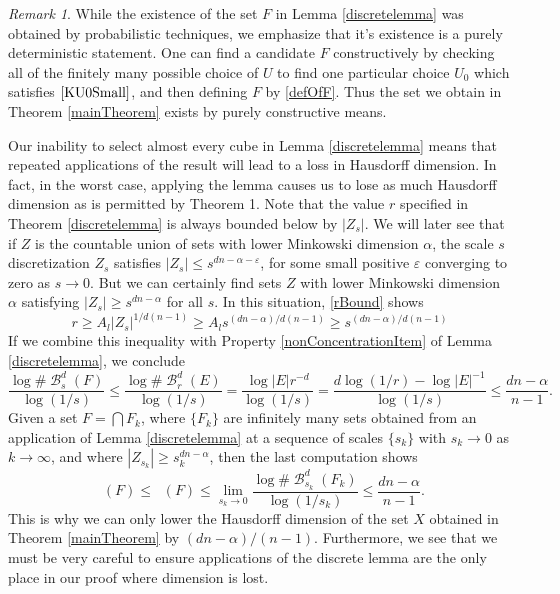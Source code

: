\documentclass[dvipsnames,letterpaper,12pt]{article}
\numberwithin{equation}{section}
\theoremstyle{plain}
\theoremstyle{remark}
\newtheorem*{remark}{Remark}
\DeclareMathOperator{\hausdim}{\dim_{\mathbf{H}}}
\DeclareMathOperator{\upminkdim}{\overline{\dim}_{\mathbf{M}}}
\DeclareMathOperator{\B}{\mathcal{B}}
\begin{document}
\begin{remark}
	While the existence of the set $F$ in Lemma \ref{discretelemma} was obtained by probabilistic techniques, we emphasize that it's existence is a purely deterministic statement. One can find a candidate $F$ constructively by checking all of the finitely many possible choice of $U$ to find one particular choice $U_0$ which satisfies $\eqref{KU0Small}$, and then defining $F$ by \eqref{defOfF}.
	Thus the set we obtain in Theorem \ref{mainTheorem} exists by purely constructive means.
\end{remark}

Our inability to select almost every cube in Lemma \ref{discretelemma} means that repeated applications of the result will lead to a loss in Hausdorff dimension. In fact, in the worst case, applying the lemma causes us to lose as much Hausdorff dimension as is permitted by Theorem 1. Note that the value $r$ specified in Theorem \ref{discretelemma} is always bounded below by $|Z_s|$. We will later see that if $Z$ is the countable union of sets with lower Minkowski dimension $\alpha$, the scale $s$ discretization $Z_s$ satisfies $|Z_s| \leq s^{dn - \alpha - \varepsilon}$, for some small positive $\varepsilon$ converging to zero as $s \to 0$. But we can certainly find sets $Z$ with lower Minkowski dimension $\alpha$ satisfying $|Z_s| \geq s^{dn - \alpha}$ for all $s$. In this situation, \eqref{rBound} shows
%
\begin{equation} \label{rWorstCase}
	r \geq A_l |Z_s|^{1/d(n-1)} \geq A_l s^{(dn - \alpha)/d(n-1)} \geq s^{(dn - \alpha)/d(n-1)}
\end{equation}
%
If we combine this inequality with Property \ref{nonConcentrationItem} of Lemma \ref{discretelemma}, we conclude
%
\[	\frac{\log \# \B^d_s(F)}{\log(1/s)} \leq \frac{\log \# \B^d_r(E)}{\log(1/s)} = \frac{\log |E| r^{-d}}{\log(1/s)} = \frac{d \log(1/r) - \log |E|^{-1}}{\log(1/s)} \leq \frac{dn - \alpha}{n - 1}. \]
%
Given a set $F = \bigcap F_k$, where $\{ F_k \}$ are infinitely many sets obtained from an application of Lemma \ref{discretelemma} at a sequence of scales $\{ s_k \}$ with $s_k \to 0$ as $k \to \infty$, and where $|Z_{s_k}| \geq s_k^{dn - \alpha}$, then the last computation shows%
%
\[	\hausdim(F) \leq \upminkdim(F) \leq \lim_{s_k \to 0} \frac{\log \# \B^d_{s_k}(F_k)}{\log(1/s_k)} \leq \frac{dn - \alpha}{n-1}. \]
%
This is why we can only lower the Hausdorff dimension of the set $X$ obtained in Theorem \ref{mainTheorem} by $(dn - \alpha)/(n-1)$. Furthermore, we see that we must be very careful to ensure applications of the discrete lemma are the only place in our proof where dimension is lost.
\end{document}
